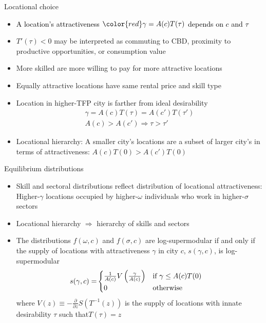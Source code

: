 \documentclass[10pt,notes=hide]{beamer}
\begin{document}
\begin{frame}{Locational choice}
\begin{itemize}
\item \textcolor{black}{A location's attractiveness ${\color{red}\gamma}=A(c)T(\tau)$
depends on $c$ and $\tau$}
\item $T'(\tau)<0$ may be interpreted as commuting to CBD, proximity to
productive opportunities, or consumption value
\item More skilled are more willing to pay for more attractive locations
\item Equally attractive locations have same rental price and skill type
\item Location in higher-TFP city is farther from ideal desirability
\begin{align*}
\gamma=A(c)T(\tau)=A(c')T(\tau')\\
A(c)>A(c')\Rightarrow\tau>\tau'
\end{align*}
\item Locational hierarchy: A smaller city's locations are a subset of larger
city's in terms of attractiveness: $A(c)T(0)>A(c')T(0)$ 
\end{itemize}
\end{frame}
\begin{frame}{Equilibrium distributions}
\begin{itemize}
\item Skill and sectoral distributions reflect distribution of locational
attractiveness: Higher-$\gamma$ locations occupied by higher-$\omega$
individuals who work in higher-$\sigma$ sectors
\item Locational hierarchy $\Rightarrow$ hierarchy of skills and sectors
\item The distributions $f(\omega,c)$ and $f(\sigma,c)$ are log-supermodular
if and only if the supply of locations with attractiveness $\gamma$
in city $c$, $s(\gamma,c)$, is log-supermodular 
\begin{align*}
s(\gamma,c)= & \begin{cases}
\frac{1}{A(c)}V\left(\frac{\gamma}{A(c)}\right) & \textnormal{if }\gamma\leq A(c)T(0)\\
0 & \textnormal{otherwise}
\end{cases}
\end{align*}
where\textrm{ $V(z)\equiv-\frac{\partial}{\partial z}S\left(T^{-1}(z)\right)$
is }the supply of locations with innate desirability $\tau$ such
that$T(\tau)=z$
\end{itemize}
\end{frame}
\end{document}

